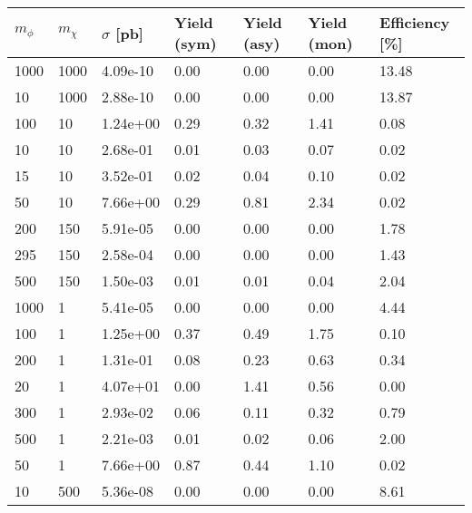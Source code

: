 \begin{table}
\small
\centering
\begin{tabular}{lllllll}
\hline
$m_\phi$ & $m_\chi$ & $\sigma$ [pb] & Yield (sym) & Yield (asy) & Yield (mon) & Efficiency [\%] \\ \hline
1000      &   1000      &   4.09e-10  &   0.00      &   0.00      &   0.00      &   13.48     \\ 
10        &   1000      &   2.88e-10  &   0.00      &   0.00      &   0.00      &   13.87     \\ 
100       &   10        &   1.24e+00  &   0.29      &   0.32      &   1.41      &   0.08      \\ 
10        &   10        &   2.68e-01  &   0.01      &   0.03      &   0.07      &   0.02      \\ 
15        &   10        &   3.52e-01  &   0.02      &   0.04      &   0.10      &   0.02      \\ 
50        &   10        &   7.66e+00  &   0.29      &   0.81      &   2.34      &   0.02      \\ 
200       &   150       &   5.91e-05  &   0.00      &   0.00      &   0.00      &   1.78      \\ 
295       &   150       &   2.58e-04  &   0.00      &   0.00      &   0.00      &   1.43      \\ 
500       &   150       &   1.50e-03  &   0.01      &   0.01      &   0.04      &   2.04      \\ 
1000      &   1         &   5.41e-05  &   0.00      &   0.00      &   0.00      &   4.44      \\ 
100       &   1         &   1.25e+00  &   0.37      &   0.49      &   1.75      &   0.10      \\ 
200       &   1         &   1.31e-01  &   0.08      &   0.23      &   0.63      &   0.34      \\ 
20        &   1         &   4.07e+01  &   0.00      &   1.41      &   0.56      &   0.00      \\ 
300       &   1         &   2.93e-02  &   0.06      &   0.11      &   0.32      &   0.79      \\ 
500       &   1         &   2.21e-03  &   0.01      &   0.02      &   0.06      &   2.00      \\ 
50        &   1         &   7.66e+00  &   0.87      &   0.44      &   1.10      &   0.02      \\ 
10        &   500       &   5.36e-08  &   0.00      &   0.00      &   0.00      &   8.61      \\ 

\end{tabular}
\end{table}
